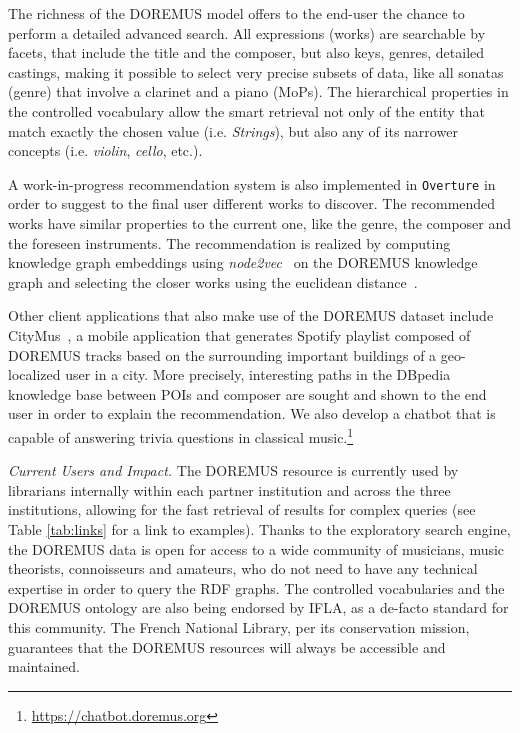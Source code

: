 The richness of the DOREMUS model offers to the end-user the chance to perform a detailed advanced search. All expressions (works) are searchable by facets, that include the title and the composer, but also keys, genres, detailed castings, making it possible to select very precise subsets of data, like all sonatas (genre) that involve a clarinet and a piano (MoPs). The hierarchical properties in the controlled vocabulary allow the smart retrieval not only of the entity that match exactly the chosen value (i.e. \textit{Strings}), but also any of its narrower concepts (i.e. \textit{violin}, \textit{cello}, etc.).

A {work-in-progress} recommendation system is also implemented in \texttt{Overture} in order to suggest to the final user different works to discover. The recommended works have similar properties to the current one, like the genre, the composer and the foreseen instruments. The recommendation is realized by computing knowledge graph embeddings using \textit{node2vec}~\cite{node2vec-kdd2016} on the DOREMUS knowledge graph and selecting the closer works using the euclidean distance~\cite{lisena2017artistsimilarity}.

Other client applications that also make use of the DOREMUS dataset include CityMus~\cite{lisena:iswc2017}, a mobile application that generates Spotify playlist composed of DOREMUS tracks based on the surrounding important buildings of a geo-localized user in a city. More precisely, interesting paths in the DBpedia knowledge base between POIs and composer are sought and shown to the end user in order to explain the recommendation. We also develop a chatbot that is capable of answering trivia questions in classical music.\footnote{\url{https://chatbot.doremus.org}}

\textit{Current Users and Impact.} The DOREMUS resource is currently used by librarians internally within each partner institution and across the three institutions, allowing for the fast retrieval of results for complex queries (see Table \ref{tab:links} for a link to examples). Thanks to the exploratory search engine, the DOREMUS data is open for access to a  wide community of musicians, music theorists, connoisseurs and amateurs, who do not need to have any technical expertise in order to query the RDF graphs. The controlled vocabularies and the DOREMUS ontology are also being endorsed by IFLA, as a de-facto standard for this community. The French National Library, per its conservation mission, guarantees that the DOREMUS resources will always be accessible and maintained.

